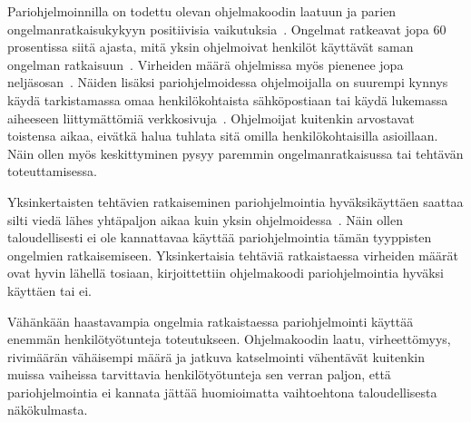 \documentclass[finnish]{tktltiki2}
\theoremstyle{definition}
\theoremstyle{remark}
\begin{document}
Pariohjelmoinnilla on todettu olevan ohjelmakoodin laatuun ja parien ongelmanratkaisukykyyn positiivisia vaikutuksia~\cite{pairprogramming}. Ongelmat ratkeavat jopa 60 prosentissa siitä ajasta, mitä yksin ohjelmoivat henkilöt käyttävät saman ongelman ratkaisuun~\cite{meta}. Virheiden määrä ohjelmissa myös pienenee jopa neljäsosan~\cite{williams00str}. Näiden lisäksi pariohjelmoidessa ohjelmoijalla on suurempi kynnys käydä tarkistamassa omaa henkilökohtaista sähköpostiaan tai käydä lukemassa aiheeseen liittymättömiä verkkosivuja~\cite{williams03pair}. Ohjelmoijat kuitenkin arvostavat toistensa aikaa, eivätkä halua tuhlata sitä omilla henkilökohtaisilla asioillaan. Näin ollen myös keskittyminen pysyy paremmin ongelmanratkaisussa tai tehtävän toteuttamisessa.

Yksinkertaisten tehtävien ratkaiseminen pariohjelmointia hyväksikäyttäen saattaa silti viedä lähes yhtäpaljon aikaa kuin yksin ohjelmoidessa~\cite{meta}. Näin ollen taloudellisesti ei ole kannattavaa käyttää pariohjelmointia tämän tyyppisten ongelmien ratkaisemiseen. Yksinkertaisia tehtäviä ratkaistaessa virheiden määrät ovat hyvin lähellä tosiaan, kirjoittettiin ohjelmakoodi pariohjelmointia hyväksi käyttäen tai ei.

Vähänkään haastavampia ongelmia ratkaistaessa pariohjelmointi käyttää enemmän henkilötyötunteja toteutukseen. Ohjelmakoodin laatu, virheettömyys, rivimäärän vähäisempi määrä ja jatkuva katselmointi vähentävät kuitenkin muissa vaiheissa tarvittavia henkilötyötunteja sen verran paljon, että pariohjelmointia ei kannata jättää huomioimatta vaihtoehtona taloudellisesta näkökulmasta.

\newpage


%
%
% 
%



\end{document}
